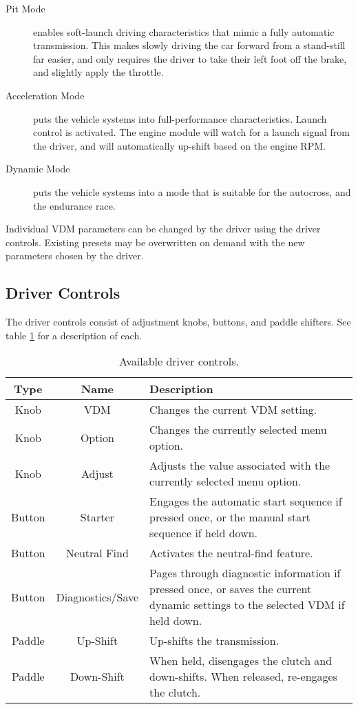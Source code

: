\begin{description}
  \item [{Pit Mode}] enables soft-launch driving characteristics that mimic a fully automatic transmission. This makes slowly driving the car forward from a stand-still far easier, and only requires the driver to take their left foot off the brake, and slightly apply the throttle.
  \item [{Acceleration Mode}] puts the vehicle systems into full-performance characteristics. Launch control is activated. The engine module will watch for a launch signal from the driver, and will automatically up-shift based on the engine RPM.
  \item [{Dynamic Mode}] puts the vehicle systems into a mode that is suitable for the autocross, and the endurance race.
\end{description}

Individual VDM parameters can be changed by the driver using the driver controls. Existing presets may be overwritten on demand with the new parameters chosen by the driver.

\subsection{Driver Controls}
\label{sec:interface_controls}

The driver controls consist of adjustment knobs, buttons, and paddle shifters. See table \ref{table:driver_controls} for a description of each.

\begin{table}[H]
\caption{Available driver controls.}
\centering
\begin{tabular}{|c|c|p{8 cm}|}
	\hline 
	Type & Name & Description \\
	\hline
	\hline 
	Knob & VDM & Changes the current VDM setting. \\
	\hline 
	Knob & Option & Changes the currently selected menu option. \\
	\hline
	Knob & Adjust & Adjusts the value associated with the currently selected menu option. \\
	\hline
	Button & Starter & Engages the automatic start sequence if pressed once, or the manual start sequence if held down.\\
	\hline
	Button & Neutral Find & Activates the neutral-find feature. \\
	\hline
	Button & Diagnostics/Save & Pages through diagnostic information if pressed once, or saves the current dynamic settings to the selected VDM if held down.\\		
	\hline 		
	Paddle & Up-Shift & Up-shifts the transmission. \\
	\hline
	Paddle & Down-Shift & When held, disengages the clutch and down-shifts. When released, re-engages the clutch. \\
	\hline
\end{tabular}
\label{table:driver_controls}
\end{table}

